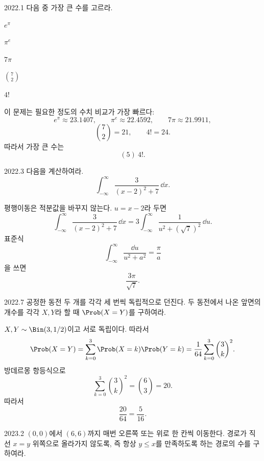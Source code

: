 \begin{pastproblem}{2022.1}
다음 중 가장 큰 수를 고르라.
\begin{problemchoices}
\item $e^\pi$
\item $\pi^e$
\item $7\pi$
\item $\binom72$
\item $4!$
\end{problemchoices}
\end{pastproblem}

\begin{solution}
이 문제는 필요한 정도의 수치 비교가 가장 빠르다:
\[
e^\pi\approx23.1407,\qquad
\pi^e\approx22.4592,\qquad
7\pi\approx21.9911,
\]
\[
\binom72=21,\qquad 4!=24.
\]
따라서 가장 큰 수는
\[
\boxed{(5)\ 4!}.
\]
\end{solution}

\begin{pastproblem}{2022.3}
다음을 계산하여라.
\[
\int_{-\infty}^{\infty}\frac{3}{(x-2)^2+7}\,\dd x.
\]
\end{pastproblem}

\begin{solution}
평행이동은 적분값을 바꾸지 않는다. $u=x-2$라 두면
\[
\int_{-\infty}^{\infty}\frac{3}{(x-2)^2+7}\,\dd x
=3\int_{-\infty}^{\infty}\frac{1}{u^2+(\sqrt7)^2}\,\dd u.
\]
표준식
\[
\int_{-\infty}^{\infty}\frac{\dd u}{u^2+a^2}=\frac\pi a
\]
을 쓰면
\[
\boxed{\frac{3\pi}{\sqrt7}}.
\]
\end{solution}

\begin{pastproblem}{2022.7}
공정한 동전 두 개를 각각 세 번씩 독립적으로 던진다. 두 동전에서 나온 앞면의 개수를 각각 $X,Y$라 할 때 $\Prob(X=Y)$를 구하여라.
\end{pastproblem}

\begin{solution}
$X,Y\sim\Bin(3,1/2)$이고 서로 독립이다. 따라서
\[
\Prob(X=Y)
=\sum_{k=0}^3\Prob(X=k)\Prob(Y=k)
=\frac1{64}\sum_{k=0}^3\binom3k^2.
\]
방데르몽 항등식으로
\[
\sum_{k=0}^3\binom3k^2=\binom63=20.
\]
따라서
\[
\boxed{\frac{20}{64}=\frac5{16}}.
\]
\end{solution}

\begin{pastproblem}{2023.2}
$(0,0)$에서 $(6,6)$까지 매번 오른쪽 또는 위로 한 칸씩 이동한다. 경로가 직선 $x=y$ 위쪽으로 올라가지 않도록, 즉 항상 $y\le x$를 만족하도록 하는 경로의 수를 구하여라.
\end{pastproblem}

